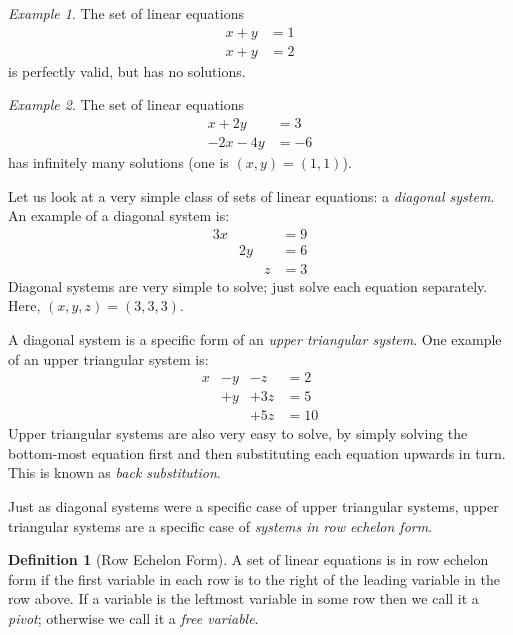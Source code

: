 \documentclass[10pt, a4paper]{amsart}
\theoremstyle{definition}
\newtheorem{defn}{Definition}
\theoremstyle{remark}
\newtheorem{ex}{Example}
\begin{document}
\begin{ex}
  The set of linear equations
  \begin{align*}
    x + y &= 1\\
    x + y &= 2
  \end{align*}
  is perfectly valid, but has no solutions.
\end{ex}

\begin{ex}
  The set of linear equations
  \begin{align*}
    x + 2y &= 3\\
    -2x - 4y &= -6
  \end{align*}
  has infinitely many solutions (one is $ (x,y) = (1,1) $).
\end{ex}

Let us look at a very simple class of sets of linear equations: a
\emph{diagonal system}. An example of a diagonal system is:
\begin{displaymath}\begin{array}{rlll}
  3x &    &    &= 9\\
     & 2y &    &= 6\\
     &    &  z &= 3
\end{array}\end{displaymath}
Diagonal systems are very simple to solve; just solve each equation
separately. Here, $ (x,y,z) = (3,3,3) $.

A diagonal system is a specific form of an \emph{upper triangular
system}. One example of an upper triangular system is:
\begin{displaymath}\begin{array}{rlll}
  x & -y &  -z &= 2\\
    & +y & +3z &= 5\\
    &    & +5z &= 10
\end{array}\end{displaymath}
Upper triangular systems are also very easy to solve, by simply solving
the bottom-most equation first and then substituting each equation upwards
in turn. This is known as \emph{back substitution}.

Just as diagonal systems were a specific case of upper triangular systems,
upper triangular systems are a specific case of \emph{systems in row echelon form}.

\begin{defn}[Row Echelon Form]
  A set of linear equations is in row echelon form if the
  first variable in each row is to the right of the leading
  variable in the row above. If a variable is the leftmost
  variable in some row then we call it a \emph{pivot}; otherwise
  we call it a \emph{free variable}.
\end{defn}
\end{document}
